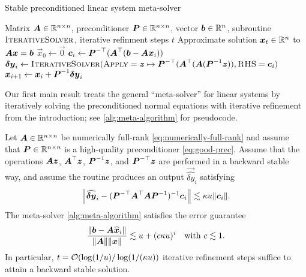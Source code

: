 \documentclass[onefignum,onetabnum,pagebackref,dvipsnames]{siamart220329}
\begin{document}
\begin{algorithm}[t]
	\caption{Stable preconditioned linear system meta-solver} \label{alg:meta-algorithm}
	\begin{algorithmic}[1]
		\Require Matrix $\boldsymbol{A}\in\mathbb{R}^{n\times n}$, preconditioner $\boldsymbol{P} \in \mathbb{R}^{n\times n}$, vector $\boldsymbol{b}\in\mathbb{R}^n$, subroutine  $\Call{IterativeSolver}{}$, iterative refinment steps $t$
		\Ensure Approximate solution $\boldsymbol{x}_t\in\mathbb{R}^n$ to $\boldsymbol{A}\boldsymbol{x} = \boldsymbol{b}$
        \State $\vec{x}_0 \gets \vec{0}$
        \State $\boldsymbol{c}_i \gets \boldsymbol{P}^{-\top}(\boldsymbol{A}^\top(\boldsymbol{b} - \boldsymbol{A}\boldsymbol{x}_i))$
        \State $\vec{\delta y}_{i} \gets \Call{IterativeSolver}{\textsc{Apply} = \vec{z} \mapsto \mat{P}^{-\top}(\mat{A}^\top(\mat{A}(\mat{P}^{-1}\vec{z})),\textsc{RHS} = \vec{c}_i}$ 
        \State $\boldsymbol{x}_{i+1} \gets \boldsymbol{x}_i + \boldsymbol{P}^{-1}\boldsymbol{\delta y}_{i}$ 
        \EndFor
	\end{algorithmic}
\end{algorithm}

Our first main result treats the general ``meta-solver'' for linear systems by iteratively solving the preconditioned normal equations with iterative refinement from the introduction; see \cref{alg:meta-algorithm} for pseudocode.

\begin{theorem} \label{thm:main-meta}
    Let $\boldsymbol{A} \in \mathbb{R}^{n\times n}$ be numerically full-rank \cref{eq:numerically-full-rank} and assume that $\boldsymbol{P} \in \mathbb{R}^{n\times n}$ is a high-quality preconditioner \cref{eq:good-prec}.
    Assume that the operations $\boldsymbol{A}\boldsymbol{z}$, $\boldsymbol{A}^\top\boldsymbol{z}$, $\boldsymbol{P}^{-1}\boldsymbol{z}$, and $\boldsymbol{P}^{-\top}\boldsymbol{z}$ are performed in a backward stable way, and assume the  routine produces an output $\vec{\hat{\delta y}}_i$ satisfying
    \begin{equation} \label{eq:iterative-solver-guarantee}
        \norm{\vec{\hat{\delta y}}_i - (\mat{P}^{-\top}\mat{A}^\top\mat{A}\mat{P}^{-1})^{-1}\vec{c}_i} \lesssim \kappa u \norm{\vec{c}_i}.
    \end{equation}
    The meta-solver \cref{alg:meta-algorithm} satisfies the error guarantee
    \begin{equation} \label{eq:meta-error-guarantee}
        \frac{\norm{\vec{b} - \mat{A}\vec{\hat{x}}_i}}{\norm{\mat{A}}\norm{\vec{x}}} \lesssim u + (c\kappa u)^i \quad \text{with } c\lesssim 1.
    \end{equation}
    In particular, $t = \mathcal{O}(\log(1/u) / \log(1/(\kappa u))$ iterative refinement steps suffice to attain a backward stable solution.
\end{theorem}
\end{document}
